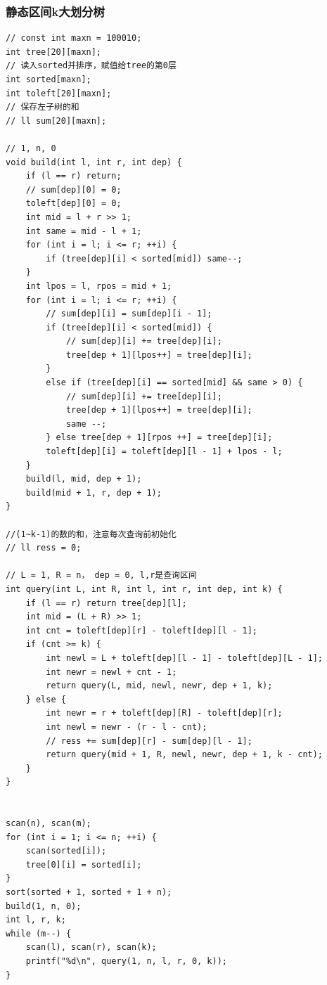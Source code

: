 \documentclass[twoside]{article}
\begin{document}
\subsubsection{静态区间k大划分树}
\begin{lstlisting}
// const int maxn = 100010;
int tree[20][maxn];
// 读入sorted并排序，赋值给tree的第0层
int sorted[maxn];
int toleft[20][maxn];
// 保存左子树的和
// ll sum[20][maxn];

// 1, n, 0
void build(int l, int r, int dep) {
    if (l == r) return;
    // sum[dep][0] = 0;
    toleft[dep][0] = 0;
    int mid = l + r >> 1;
    int same = mid - l + 1;
    for (int i = l; i <= r; ++i) {
        if (tree[dep][i] < sorted[mid]) same--;
    }
    int lpos = l, rpos = mid + 1;
    for (int i = l; i <= r; ++i) {
        // sum[dep][i] = sum[dep][i - 1];
        if (tree[dep][i] < sorted[mid]) {
            // sum[dep][i] += tree[dep][i];
            tree[dep + 1][lpos++] = tree[dep][i];
        }
        else if (tree[dep][i] == sorted[mid] && same > 0) {
            // sum[dep][i] += tree[dep][i];
            tree[dep + 1][lpos++] = tree[dep][i];
            same --;
        } else tree[dep + 1][rpos ++] = tree[dep][i];
        toleft[dep][i] = toleft[dep][l - 1] + lpos - l;
    }
    build(l, mid, dep + 1);
    build(mid + 1, r, dep + 1);
}

//(1~k-1)的数的和，注意每次查询前初始化
// ll ress = 0;

// L = 1, R = n， dep = 0, l,r是查询区间
int query(int L, int R, int l, int r, int dep, int k) {
    if (l == r) return tree[dep][l];
    int mid = (L + R) >> 1;
    int cnt = toleft[dep][r] - toleft[dep][l - 1];
    if (cnt >= k) {
        int newl = L + toleft[dep][l - 1] - toleft[dep][L - 1];
        int newr = newl + cnt - 1;
        return query(L, mid, newl, newr, dep + 1, k);
    } else {
        int newr = r + toleft[dep][R] - toleft[dep][r];
        int newl = newr - (r - l - cnt);
        // ress += sum[dep][r] - sum[dep][l - 1];
        return query(mid + 1, R, newl, newr, dep + 1, k - cnt);
    }
}


scan(n), scan(m);
for (int i = 1; i <= n; ++i) {
    scan(sorted[i]);
    tree[0][i] = sorted[i];
}
sort(sorted + 1, sorted + 1 + n);
build(1, n, 0);
int l, r, k;
while (m--) {
    scan(l), scan(r), scan(k);
    printf("%d\n", query(1, n, l, r, 0, k));
}\end{lstlisting}
\end{document}
